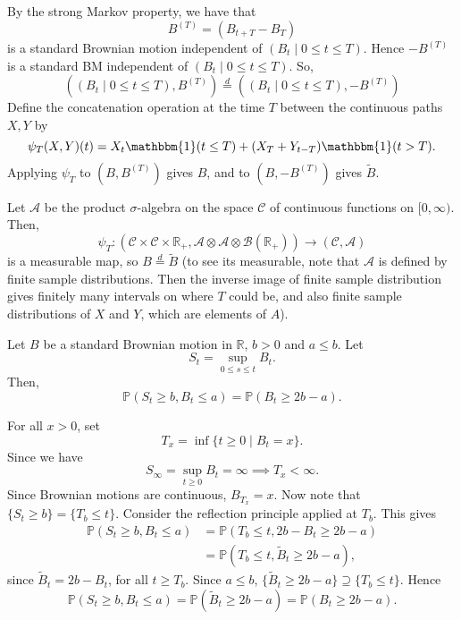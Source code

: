 \documentclass[12pt]{article}
\begin{document}
\begin{proofbox}
	By the strong Markov property, we have that
	\[
	B^{(T)} = (B_{t + T}- B_T)
	\]
	is a standard Brownian motion independent of $(B_t \mid 0 \leq t \leq T)$. Hence $-B^{(T)}$ is a standard BM independent of $(B_t \mid 0 \leq t \leq T)$. So,
	\[
		((B_t \mid 0 \leq t \leq T), B^{(T)}) \overset d = ((B_t \mid 0 \leq t \leq T), - B^{(T)})
	\]
	Define the concatenation operation at the time $T$ between the continuous paths $X, Y$ by
	\[
	\psi_T(X, Y)(t) = X_t \mathbbm{1}(t \leq T) + (X_T + Y_{t - T}) \mathbbm{1}(t > T).
	\]
	Applying $\psi_T$ to $(B, B^{(T)})$ gives $B$, and to $(B, - B^{(T)})$ gives $\tilde B$.

	Let $\mathcal{A}$ be the product $\sigma$-algebra on the space $\mathcal{C}$ of continuous functions on $[0, \infty)$. Then,
	\[
	\psi_T : (\mathcal{C} \times \mathcal{C} \times \mathbb{R}_+, \mathcal{A} \otimes \mathcal{A} \otimes \mathcal{B}(\mathbb{R}_+)) \to (\mathcal{C}, \mathcal{A})
	\]
	is a measurable map, so $B \overset d= \tilde B$ (to see its measurable, note that $\mathcal{A}$ is defined by finite sample distributions. Then the inverse image of finite sample distribution gives finitely many intervals on where $T$ could be, and also finite sample distributions of $X$ and $Y$, which are elements of $A$).
\end{proofbox}

\begin{corollary}
	Let $B$ be a standard Brownian motion in $\mathbb{R}$, $b > 0$ and $a \leq b$. Let
	\[
	S_t = \sup_{0 \leq s \leq t} B_t.
	\]
	Then,
	\[
	\mathbb{P}(S_t \geq b, B_t \leq a) = \mathbb{P}(B_t \geq 2b - a).
	\]
\end{corollary}

\begin{proofbox}
	For all $x > 0$, set
	\[
		T_x = \inf\{t \geq 0 \mid B_t = x\}.
	\]
	Since we have
	\[
	S_\infty = \sup_{t \geq 0} B_t = \infty \implies T_x < \infty.
	\]
	Since Brownian motions are continuous, $B_{T_x} = x$. Now note that $\{S_t \geq b\} = \{T_b \leq t\}$. Consider the reflection principle applied at $T_b$. This gives
	\begin{align*}
		\mathbb{P}(S_t \geq b, B_t \leq a) &= \mathbb{P}(T_b \leq t, 2b - B_t \geq 2b - a) \\
						   &= \mathbb{P}(T_b \leq t, \tilde B_t \geq 2b - a),
	\end{align*}
	since $\tilde B_t = 2b - B_t$, for all $t \geq T_b$. Since $a \leq b$, $\{\tilde B_t \geq 2b - a\}  \supseteq \{T_b \leq t\}$. Hence
	\[
	\mathbb{P}(S_t \geq b, B_t \leq a) = \mathbb{P}(\tilde B_t \geq 2b - a) = \mathbb{P}(B_t \geq 2b - a).
	\]
\end{proofbox}
\end{document}
